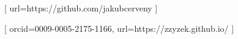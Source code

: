 \author[1]{Jakub \v{C}erven\'{y}}[ url=https://github.com/jakubcerveny ]
\author[2]{Zzyv Zzyzek}[ orcid=0009-0005-2175-1166, url=https://zzyzek.github.io/ ]

